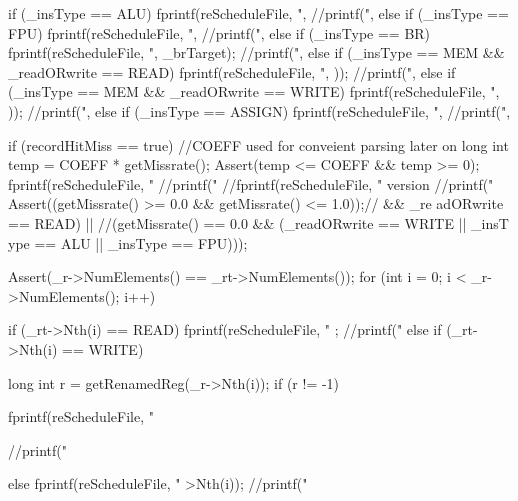 \begin{DoxyCode}
                                                                      {
        if (_insType == ALU) {
                fprintf(reScheduleFile, "\nA,%
                //printf("\nA,%
        } else if (_insType == FPU) {
                fprintf(reScheduleFile, "\nF,%
                //printf("\nF,%
        } else if (_insType == BR) {
                fprintf(reScheduleFile, "\nB,%
      _brTarget);
                //printf("\nB,%
        } else if (_insType == MEM && _readORwrite == READ) {
                fprintf(reScheduleFile, "\nR,%
      ));
                //printf("\nR,%
        } else if (_insType == MEM && _readORwrite == WRITE) {
                fprintf(reScheduleFile, "\nW,%
      ));
                //printf("\nW,%
        } else if (_insType == ASSIGN) {
                fprintf(reScheduleFile, "\nT,%
                //printf("\nT,%
        }

        if (recordHitMiss == true) {
                //COEFF used for conveient parsing later on
                long int temp = COEFF * getMissrate();
                Assert(temp <= COEFF && temp >= 0);
                fprintf(reScheduleFile, "%
                //printf("%
                //fprintf(reScheduleFile, "%
      version
                //printf("%
                Assert((getMissrate() >= 0.0 && getMissrate() <= 1.0));// &&  _re
      adORwrite == READ) ||
                       //(getMissrate() == 0.0 && (_readORwrite == WRITE || _insT
      ype == ALU || _insType == FPU)));
        }

        Assert(_r->NumElements() == _rt->NumElements());
        for (int i = 0; i < _r->NumElements(); i++) {
                if (_rt->Nth(i) == READ) {
                        fprintf(reScheduleFile, "%
      ;
                        //printf("%
                } else if (_rt->Nth(i) == WRITE) {
                        long int r = getRenamedReg(_r->Nth(i));
                        if (r != -1) {
                                fprintf(reScheduleFile, "%
      
                                //printf("%
                        } else { 
                                fprintf(reScheduleFile, "%
      >Nth(i));
                                //printf("%
                        }
                }
        }
}
\end{DoxyCode}
